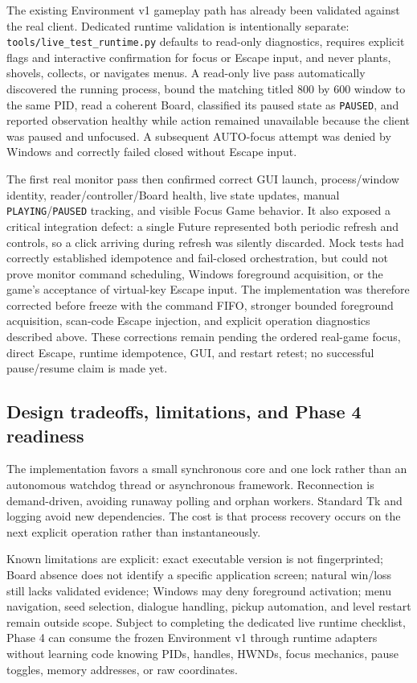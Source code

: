 \documentclass[11pt,a4paper]{article}
\begin{document}
The existing Environment v1 gameplay path has already been validated against the real client. Dedicated runtime validation is intentionally separate: \texttt{tools/live\_test\_runtime.py} defaults to read-only diagnostics, requires explicit flags and interactive confirmation for focus or Escape input, and never plants, shovels, collects, or navigates menus. A read-only live pass automatically discovered the running process, bound the matching titled 800 by 600 window to the same PID, read a coherent Board, classified its paused state as \texttt{PAUSED}, and reported observation healthy while action remained unavailable because the client was paused and unfocused. A subsequent AUTO-focus attempt was denied by Windows and correctly failed closed without Escape input.

The first real monitor pass then confirmed correct GUI launch, process/window identity, reader/controller/Board health, live state updates, manual \texttt{PLAYING}/\texttt{PAUSED} tracking, and visible Focus Game behavior. It also exposed a critical integration defect: a single Future represented both periodic refresh and controls, so a click arriving during refresh was silently discarded. Mock tests had correctly established idempotence and fail-closed orchestration, but could not prove monitor command scheduling, Windows foreground acquisition, or the game's acceptance of virtual-key Escape input. The implementation was therefore corrected before freeze with the command FIFO, stronger bounded foreground acquisition, scan-code Escape injection, and explicit operation diagnostics described above. These corrections remain pending the ordered real-game focus, direct Escape, runtime idempotence, GUI, and restart retest; no successful pause/resume claim is made yet.

\subsection{Design tradeoffs, limitations, and Phase 4 readiness}
The implementation favors a small synchronous core and one lock rather than an autonomous watchdog thread or asynchronous framework. Reconnection is demand-driven, avoiding runaway polling and orphan workers. Standard Tk and logging avoid new dependencies. The cost is that process recovery occurs on the next explicit operation rather than instantaneously.

Known limitations are explicit: exact executable version is not fingerprinted; Board absence does not identify a specific application screen; natural win/loss still lacks validated evidence; Windows may deny foreground activation; menu navigation, seed selection, dialogue handling, pickup automation, and level restart remain outside scope. Subject to completing the dedicated live runtime checklist, Phase 4 can consume the frozen Environment v1 through runtime adapters without learning code knowing PIDs, handles, HWNDs, focus mechanics, pause toggles, memory addresses, or raw coordinates.
\end{document}

